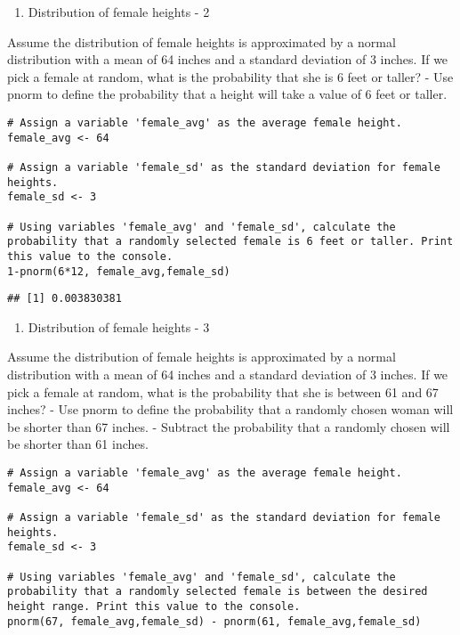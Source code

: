 \documentclass[
]{article}
\providecommand{\tightlist}{%
  \setlength{\itemsep}{0pt}\setlength{\parskip}{0pt}}
\begin{document}
\begin{enumerate}
\def\labelenumi{\arabic{enumi}.}
\setcounter{enumi}{1}
\tightlist
\item
  Distribution of female heights - 2
\end{enumerate}

Assume the distribution of female heights is approximated by a normal
distribution with a mean of 64 inches and a standard deviation of 3
inches. If we pick a female at random, what is the probability that she
is 6 feet or taller? - Use pnorm to define the probability that a height
will take a value of 6 feet or taller.

\begin{verbatim}
# Assign a variable 'female_avg' as the average female height.
female_avg <- 64

# Assign a variable 'female_sd' as the standard deviation for female heights.
female_sd <- 3

# Using variables 'female_avg' and 'female_sd', calculate the probability that a randomly selected female is 6 feet or taller. Print this value to the console.
1-pnorm(6*12, female_avg,female_sd)
\end{verbatim}

\begin{verbatim}
## [1] 0.003830381
\end{verbatim}

\begin{enumerate}
\def\labelenumi{\arabic{enumi}.}
\setcounter{enumi}{2}
\tightlist
\item
  Distribution of female heights - 3
\end{enumerate}

Assume the distribution of female heights is approximated by a normal
distribution with a mean of 64 inches and a standard deviation of 3
inches. If we pick a female at random, what is the probability that she
is between 61 and 67 inches? - Use pnorm to define the probability that
a randomly chosen woman will be shorter than 67 inches. - Subtract the
probability that a randomly chosen will be shorter than 61 inches.

\begin{verbatim}
# Assign a variable 'female_avg' as the average female height.
female_avg <- 64

# Assign a variable 'female_sd' as the standard deviation for female heights.
female_sd <- 3

# Using variables 'female_avg' and 'female_sd', calculate the probability that a randomly selected female is between the desired height range. Print this value to the console.
pnorm(67, female_avg,female_sd) - pnorm(61, female_avg,female_sd)
\end{verbatim}
\end{document}
